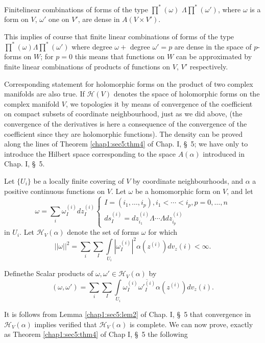 \setcounter{proposition}{0}
\begin{proposition}\label{chap2:sec2:prop1} %
  Finite\pageoriginale linear combinations of forms of the type $\prod^*(\omega)$
  $\Lambda \prod^*(\omega ')$, where $\omega$ is a form on $V$,
  $\omega'$ one on $V'$, are dense in $A(V \times V')$.  
\end{proposition}    

This implies of course that finite  linear combinations of forms of the
type $\prod^* ( \omega ) \Lambda \prod^*(\omega')$ where degree
$\omega +$ degree $\omega' =p$ are dense in the space of $p$-forms on
$W$; for $p=0$ this means that functions on $W$ can be approximated by
finite linear combinations of products of functions on $V$, $V'$
respectively. 
    
Corresponding statement for holomorphic forms on the product  of two
complex manifolds are also true. If $\mathscr{H}(V)$ denotes the space
of holomorphic forms on the complex manifold $V$, we topologies it by
means of convergence of the coefficient on compact subsets of
coordinate neighbourhood, just as we did above, (the convergence of
the derivatives is here a consequence of the convergence of the
coefficient since they are holomorphic functions). The density can be
proved along the lines of Theorem \ref{chap1:sec5:thm4} of Chap. I, \S\ 5; we have only
to introduce the Hilbert space corresponding to the space $A(\alpha)$
introduced in Chap. I, \S\ 5. 
    
Let $\{ U_i \}$ be a locally finite covering of $V$ by coordinate
neighbourhoods, and $\alpha$ a positive continuous functions on
$V$. Let $\omega$ be a homomorphic form on $V$, and let   
$$
\omega =  \sum_i \omega^{(i)}_I dz^{(i)}_I 
\begin{cases} 
  I = (i_1,\ldots , i_p), i_1 <\cdots < i_p, p =0, \ldots , n \\ 
  ds^{(i)}_I = dz^{(i)}_{i_1} \Lambda \cdots \Lambda dz^{(i)}_{i_p}
\end{cases} 
$$
in $U_i$. Let $\mathscr{H}_V (\alpha)$ denote the set of forms
$\omega$ for which 
$$
|| \omega ||^2 = \sum_i \sum_I \int\limits_{U_i}\left | \omega^{(i)}_I
\right|^2 \alpha (z^{(i)}) dv_z(i) < \infty. 
$$

Define\pageoriginale the Scalar products of $\omega, \omega' \in \mathscr{H}_V (\alpha)$ by
$$
(\omega , \omega') = \sum_i \sum_I \int\limits_{U_i}\omega^{(i)}_I
\overline{\omega'^{(i)}_I} \alpha (z^{(i)}) dv_z(i). 
$$

It is follows from Lemma \ref{chap1:sec5:lem2} of Chap. I, \S\ 5 that
convergence in 
$\mathscr{H}_V(\alpha)$ implies verified that $\mathscr{H}_V(\alpha)$
is complete. We can now prove, exactly as Theorem \ref{chap1:sec5:thm4} of Chap I, \S\
5 the following 

